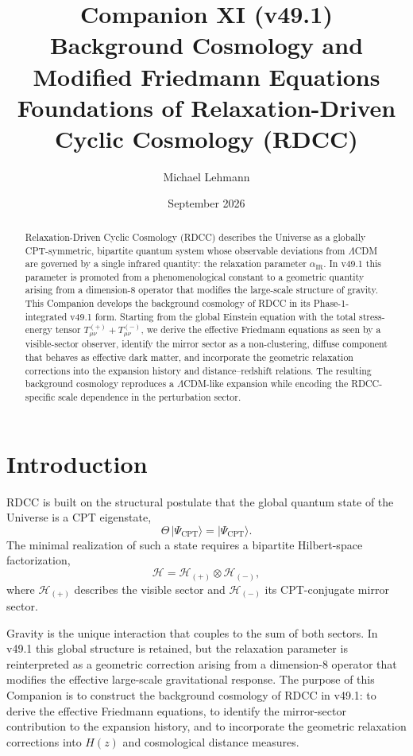 \documentclass[11pt,a4paper]{article}
\title{\textbf{Companion XI (v49.1)}\\[0.2cm]
\textbf{Background Cosmology and Modified Friedmann Equations}\\[0.2cm]
\large Foundations of Relaxation-Driven Cyclic Cosmology (RDCC)}
\author[1]{Michael Lehmann}
\affil[1]{\small Independent Researcher, Relaxation-Driven Cyclic Cosmology (RDCC)\\
\texttt{mi.lehmann@gmx.de}}
\date{September 2026}
\begin{document}
\maketitle

\begin{abstract}
Relaxation-Driven Cyclic Cosmology (RDCC) describes the Universe as a globally
CPT-symmetric, bipartite quantum system whose observable deviations from
\(\Lambda\)CDM are governed by a single infrared quantity: the relaxation
parameter \(\alpha_{\mathrm{IR}}\). In v49.1 this parameter is promoted from a
phenomenological constant to a geometric quantity arising from a dimension-8
operator that modifies the large-scale structure of gravity. This Companion
develops the background cosmology of RDCC in its Phase-1-integrated v49.1
form. Starting from the global Einstein equation with the total stress-energy
tensor \(T^{(+)}_{\mu\nu}+T^{(-)}_{\mu\nu}\), we derive the effective
Friedmann equations as seen by a visible-sector observer, identify the
mirror sector as a non-clustering, diffuse component that behaves as
effective dark matter, and incorporate the geometric relaxation corrections
into the expansion history and distance--redshift relations. The resulting
background cosmology reproduces a \(\Lambda\)CDM-like expansion while
encoding the RDCC-specific scale dependence in the perturbation sector.
\end{abstract}

\tableofcontents
\newpage

\section{Introduction}

RDCC is built on the structural postulate that the global quantum state of
the Universe is a CPT eigenstate,
\begin{equation}
  \Theta\,|\Psi_{\mathrm{CPT}}\rangle = |\Psi_{\mathrm{CPT}}\rangle.
\end{equation}
The minimal realization of such a state requires a bipartite Hilbert-space
factorization,
\begin{equation}
  \mathcal{H} = \mathcal{H}_{(+)} \otimes \mathcal{H}_{(-)},
\end{equation}
where \(\mathcal{H}_{(+)}\) describes the visible sector and
\(\mathcal{H}_{(-)}\) its CPT-conjugate mirror sector.

Gravity is the unique interaction that couples to the sum of both sectors.
In v49.1 this global structure is retained, but the relaxation parameter is
reinterpreted as a geometric correction arising from a dimension-8 operator
that modifies the effective large-scale gravitational response. The purpose
of this Companion is to construct the background cosmology of RDCC in
v49.1: to derive the effective Friedmann equations, to identify the
mirror-sector contribution to the expansion history, and to incorporate the
geometric relaxation corrections into \(H(z)\) and cosmological distance
measures.
\end{document}
